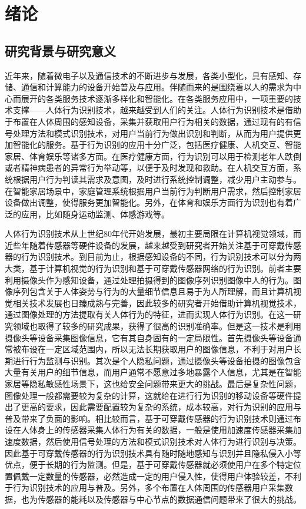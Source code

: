 
\chapter{绪论}
\section{研究背景与研究意义}
\par 近年来，随着微电子以及通信技术的不断进步与发展，各类小型化，具有感知、存储、通信和计算能力的设备开始普及与应用。伴随而来的是围绕着以人的需求为中心而展开的各类服务技术逐渐多样化和智能化。在各类服务应用中，一项重要的技术支撑——人体行为识别技术，越来越受到人们的关注。人体行为识别技术是借助于布置在人体周围的感知设备，采集并获取用户行为相关的数据，通过现有的有信号处理方法和模式识别技术，对用户当前行为做出识别和判断，从而为用户提供更加智能化的服务。基于行为识别的应用十分广泛，包括医疗健康、人机交互、智能家居、体育娱乐等诸多方面。在医疗健康方面，行为识别可以用于检测老年人跌倒或者精神病患者的异常行为举动等，以便于及时发现和救助。在人机交互方面，系统根据用户行为判读其需求及意图，及时进行系统控制调整，减少用户主动参与。在智能家居场景中，家庭管理系统根据用户当前行为判断用户需求，然后控制家居设备做出调整，使得服务更加智能化。另外，在体育和娱乐方面行为识别也有着广泛的应用，比如随身运动监测、体感游戏等。

\par 人体行为识别技术从上世纪80年代开始发展\cite{surveyOnSensors}，最初主要局限在计算机视觉领域，而近些年随着传感器等硬件设备的发展，越来越受到研究者开始关注基于可穿戴传感器的行为识别技术。到目前为止，根据感知设备的不同，行为识别技术可以分为两大类，基于计算机视觉的行为识别和基于可穿戴传感器网络的行为识别。前者主要利用摄像头作为感知设备，通过处理拍摄得到的图像序列识别图像中人的行为\cite{surveyOnVision}。图像序列包含关于人体姿势与行为的大量细节信息且易于为人所理解，而且计算机视觉相关技术发展也日臻成熟与完善，因此较多的研究者开始借助计算机视觉技术，通过图像处理的方法提取有关人体行为的特征，进而实现人体行为识别。在这一研究领域也取得了较多的研究成果，获得了很高的识别准确率。但是这一技术是利用摄像头等设备采集图像信息，它有其自身固有的一定局限性。首先摄像头等设备通常被布设在一定区域范围内，所以无法长期获取用户的图像信息，不利于对用户长期进行行为监测与识别。其次是个人隐私问题，通过摄像头等设备拍摄的图像包含大量有关用户的细节信息，而用户通常不愿意过多地暴露个人信息，尤其是在智能家居等隐私敏感性场景下，这也给安全问题带来更大的挑战。最后是复杂性问题，图像处理一般都需要较为复杂的计算，这就给在进行行为识别的移动设备等硬件提出了更高的要求，因此需要配置较为复杂的系统，成本较高，对行为识别的应用与普及带来了负面的影响。相比较而言，基于可穿戴传感器的行为识别技术\cite{sensorBased}则通过布设在人体身上的传感器采集人体行为有关的数据，一般是使用加速度传感器采集加速度数据，然后使用信号处理的方法和模式识别技术对人体行为进行识别与决策。因此基于可穿戴传感器的行为识别技术具有随时随地感知与识别并且隐私侵入小等优点，便于长期的行为监测。但是，基于可穿戴传感器就必须使用户在多个特定位置佩戴一定数量的传感器，必然造成一定的用户侵入性，使得用户体验较差，不利于行为识别技术的应用与普及。另外，多个布置在人体周围的传感器用户采集数据，也为传感器的能耗以及传感器与中心节点的数据通信问题带来了很大的挑战。

